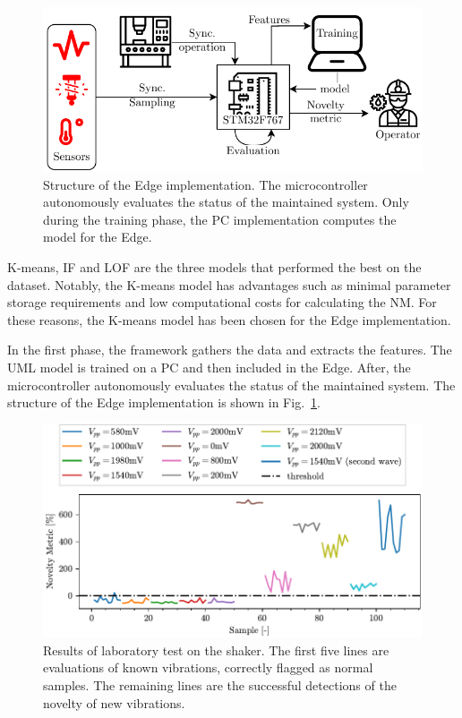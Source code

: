 \begin{figure}
    \includegraphics[width=\linewidth]{images/EmbeddedStructure.pdf}
    \caption{Structure of the Edge implementation. The microcontroller autonomously evaluates the status of the maintained system. Only during the training phase, the PC implementation computes the model for the Edge.}
    \label{fig:embedded}
\end{figure}

K-means, IF and LOF are the three models that performed the best on the dataset. Notably, the K-means model has advantages such as minimal parameter storage requirements and low computational costs for calculating the NM. For these reasons, the K-means model has been chosen for the Edge implementation.

In the first phase, the framework gathers the data and extracts the features. The UML model is trained on a PC and then included in the Edge. After, the microcontroller autonomously evaluates the status of the maintained system. The structure of the Edge implementation is shown in Fig.~\ref{fig:embedded}. 

\begin{figure}
    \includegraphics[width=\linewidth]{images/Test02_LOF.pdf}
    \caption{Results of laboratory test on the shaker. The first five lines are evaluations of known vibrations, correctly flagged as normal samples. The remaining lines are the successful detections of the novelty of new vibrations.}
    \label{fig:shaker}
\end{figure}

